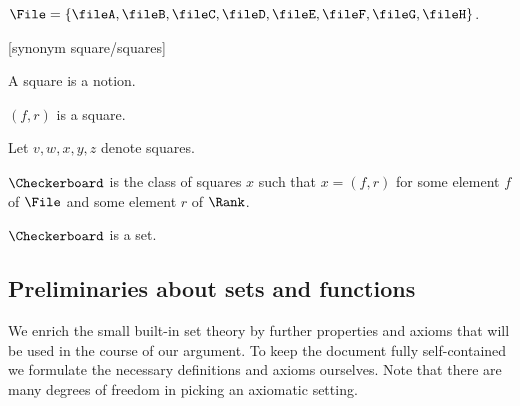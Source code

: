 \begin{forthel}
    \begin{definition}
        $\File = \{\fileA,\fileB,\fileC,\fileD,\fileE,\fileF,\fileG,\fileH\}$.
    \end{definition}

    [synonym square/squares]
    \begin{signature} A square is a notion. \end{signature}
    \begin{axiom} $(f, r)$ is a square. \end{axiom}
    Let $v, w, x, y, z$ denote squares.

    \begin{definition}
        $\Checkerboard$ is the class of squares $x$ such that $x = (f, r)$ for some
        element $f$ of $\File$ and some element $r$ of $\Rank$.
    \end{definition}

    \begin{axiom} $\Checkerboard$ is a set. \end{axiom}
\end{forthel}


\subsection{Preliminaries about sets and functions}

We enrich the small built-in set theory by further properties and axioms that
will be used in the course of our argument. To keep the document fully
self-contained we formulate the necessary definitions and axioms ourselves.
Note that there are many degrees of freedom in picking an axiomatic setting.

